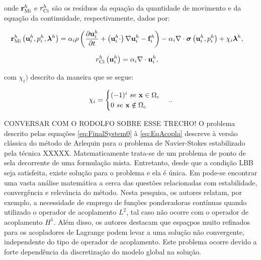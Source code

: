 \documentclass[tese_patricia]{subfiles}
\begin{document}
\noindent onde $\mathbf{r}_{\mathrm{Mi}}^{h}$ e ${r_{\mathrm{Ci}}^{h}}$ são os resíduos da equação da quantidade de movimento e da equação da continuidade, respectivamente, dados por:

\begin{align}
	\mathbf{r}_{\mathrm{Mi}}^{h} \left(\mathbf{u}_i^{h},p_i^{h},\boldsymbol{\lambda}^h \right)&=\alpha_{i} \rho\left(\frac{\partial\mathbf{u}_i^{h}}{\partial t}+ \left( \mathbf{u}_i^{h} \cdot \right) \nabla\mathbf{u}_i^{h} - \mathbf{f}_i^{h}\right) - \alpha_{i} \nabla \cdot \boldsymbol{\sigma}\left(\mathbf{u}_i^{h},p_i^{h}\right)+ \chi_{i} \boldsymbol{\lambda}^h \label{eq:resMomI},
\end{align}

\noindent

\begin{align}
	r_{\mathrm{Ci}}^{h}\left(\mathbf{u}_i^{h}\right)&= \alpha_{i} \nabla \cdot \mathbf{u}_i^{h} \label{eq:resPreI}, 
\end{align}

\noindent com $\chi_{i})$ descrito da maneira que se segue:


\begin{align}
	\chi_{i} = \begin{cases} (-1)^{i} \ se \ \mathbf{x} \in \Omega_{c} \\
			   0 \ se \ \mathbf{x} \notin \Omega_{c} \end{cases}.						. 
\end{align}

CONVERSAR COM O RODOLFO SOBRE ESSE TRECHO! 
O problema descrito pelas equações \ref{eq:FinalSystem0} à \ref{eq:EqAcopla} descreve à versão clássica do método de Arlequin para o problema de Navier-Stokes estabilizado pela técnica XXXXX. Matematicamente trata-se de um problema de ponto de sela decorrente de uma formulação mista. Entretanto, desde que a condição LBB seja satisfeita, existe solução para o problema e ela é única. 
Em  pode-se encontrar uma vasta análise matemática a cerca das questões relacionadas com estabilidade, convergência e relevância do método. Nesta pesquisa, os autores relatam, por exemplo, a necessidade de emprego de funções ponderadoras contínuas quando utilizado o operador de acoplamento $L^{2}$, tal caso não ocorre com o operador de acoplamento $H^{1}$. Além disso,  os autores destacam que espaçpos muito refinados para os acopladores de Lagrange podem levar a uma solução não convergente, independente do tipo de operador de acoplamento. Este problema ocorre devido a forte dependência da discretização do modelo global na solução.
\end{document}

